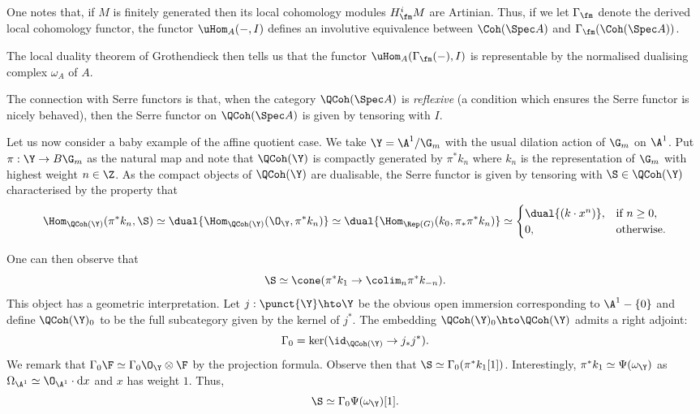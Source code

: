 \documentclass{amsart}
\begin{document}
  One notes that, if \(M\) is finitely generated then
  its local cohomology modules \(H^i_\fm M\) are Artinian.
  Thus, if we let \(\Gamma_\fm\) denote the derived
  local cohomology functor, the functor
  \(\uHom_A(-, I)\) defines an
  involutive equivalence between
  \(\Coh(\Spec A)\) and \(\Gamma_\fm(\Coh(\Spec A))\).

  The local duality theorem of Grothendieck
  then tells us that the functor \(\uHom_A(\Gamma_\fm(-), I)\)
  is representable by the normalised dualising complex \(\omega_A\)
  of \(A\).

  The connection with Serre functors is that, when
  the category \(\QCoh(\Spec A)\) is \emph{reflexive}
  (a condition which ensures the Serre functor is nicely behaved),
  then the Serre functor on \(\QCoh(\Spec A)\) is given
  by tensoring with \(I\).

  \sssec{}

  Let us now consider a baby example of the affine quotient case.
  We take \(\Y = \A^1/\G_m\) with the usual dilation action
  of \(\G_m\) on \(\A^1\). Put \(\pi: \Y \to B\G_m\)
  as the natural map and note that \(\QCoh(\Y)\) is
  compactly generated by \(\pi^\ast k_n\) where \(k_n\)
  is the representation of \(\G_m\) with highest weight
  \(n \in \Z\). As the compact objects of \(\QCoh(\Y)\)
  are dualisable, the Serre functor is given by tensoring
  with \(\S \in \QCoh(\Y)\) characterised by the property
  that
  \begin{displaymath}
    \Hom_{\QCoh(\Y)}(\pi^\ast k_n, \S) \simeq \dual{\Hom_{\QCoh(\Y)}(\O_\Y, \pi^\ast k_n)} \simeq \dual{\Hom_{\Rep(G)}(k_0, \pi_\ast \pi^\ast k_n)}
    \simeq
    \begin{cases}
      \dual{(k \cdot x^n)}, & \text{if } n \geq 0, \\
      0, & \text{otherwise.}
    \end{cases}
  \end{displaymath}
  
  One can then observe that
  \begin{displaymath}
    \S \simeq \cone(\pi^\ast k_1 \to \colim_n \pi^\ast k_{-n}).
  \end{displaymath}
  This object has a geometric interpretation.
  Let \(j: \punct{\Y} \hto \Y\) be the obvious 
  open immersion corresponding to \(\A^1 - \{0\}\)
  and define \(\QCoh(\Y)_0\) to be the full
  subcategory given by the kernel of \(j^\ast\).
  The embedding \(\QCoh(\Y)_0 \hto \QCoh(\Y)\)
  admits a right adjoint:
  \begin{displaymath}
    \Gamma_0 = \ker(\id_{\QCoh(\Y)} \to j_\ast j^\ast).
  \end{displaymath}
  We remark that \(\Gamma_0 \F \simeq \Gamma_0 \O_\Y \otimes \F\)
  by the projection formula.
  Observe then that \(\S \simeq \Gamma_0(\pi^\ast k_1 [1])\).
  Interestingly, \(\pi^\ast k_1 \simeq \Psi(\omega_\Y)\)
  as \(\Omega_{\A^1} \simeq \O_{\A^1} \cdot \mathrm{d}x\)
  and \(x\) has weight \(1\).
  Thus,
  \begin{displaymath}
    \S \simeq \Gamma_0 \Psi(\omega_\Y)[1].
  \end{displaymath}
\end{document}
